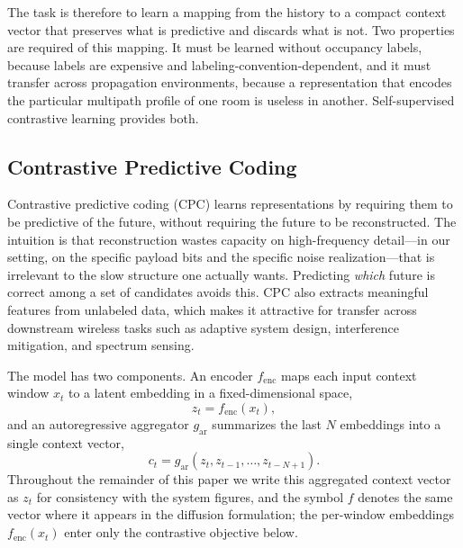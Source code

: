 \documentclass[lettersize,journal]{IEEEtran}
\begin{document}
The task is therefore to learn a mapping from the history to a compact
context vector that preserves what is predictive and discards what is
not. Two properties are required of this mapping. It must be learned
without occupancy labels, because labels are expensive and
labeling-convention-dependent, and it must transfer across propagation
environments, because a representation that encodes the particular
multipath profile of one room is useless in another. Self-supervised
contrastive learning provides both.

\subsection{\textbf{Contrastive Predictive Coding}}
Contrastive predictive coding (CPC) \cite{Oord2018} learns
representations by requiring them to be predictive of the future, without
requiring the future to be reconstructed. The intuition is that
reconstruction wastes capacity on high-frequency detail---in our setting,
on the specific payload bits and the specific noise realization---that is
irrelevant to the slow structure one actually wants. Predicting
\emph{which} future is correct among a set of candidates avoids this.
CPC also extracts meaningful features from unlabeled data, which makes it
attractive for transfer across downstream wireless tasks such as adaptive
system design, interference mitigation, and spectrum sensing.

The model has two components. An encoder $f_{\mathrm{enc}}$ maps each
input context window $x_t$ to a latent embedding in a fixed-dimensional
space,
\begin{equation}
z_t = f_{\mathrm{enc}}(x_t),
\end{equation}
and an autoregressive aggregator $g_{\mathrm{ar}}$ summarizes the last
$N$ embeddings into a single context vector,
\begin{equation}
c_t = g_{\mathrm{ar}}(z_t, z_{t-1}, \ldots, z_{t-N+1}).
\end{equation}
Throughout the remainder of this paper we write this aggregated context
vector as $z_t$ for consistency with the system figures, and the symbol
$f$ denotes the same vector where it appears in the diffusion
formulation; the per-window embeddings $f_{\mathrm{enc}}(x_t)$ enter only
the contrastive objective below.
\end{document}
